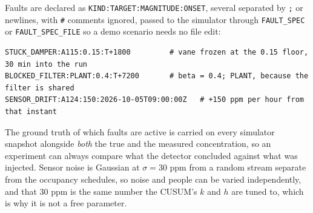 Faults are declared as \texttt{KIND:TARGET:MAGNITUDE:ONSET}, several separated by \texttt{;} or
newlines, with \texttt{\#} comments ignored, passed to the simulator through \texttt{FAULT\_SPEC}
or \texttt{FAULT\_SPEC\_FILE} so a demo scenario needs no file edit:

\begin{footnotesize}
\begin{verbatim}
STUCK_DAMPER:A115:0.15:T+1800         # vane frozen at the 0.15 floor, 30 min into the run
BLOCKED_FILTER:PLANT:0.4:T+7200       # beta = 0.4; PLANT, because the filter is shared
SENSOR_DRIFT:A124:150:2026-10-05T09:00:00Z   # +150 ppm per hour from that instant
\end{verbatim}
\end{footnotesize}

The ground truth of which faults are active is carried on every simulator snapshot alongside
\emph{both} the true and the measured concentration, so an experiment can always compare what the
detector concluded against what was injected. Sensor noise is Gaussian at
$\sigma = 30$ ppm from a random stream separate from the occupancy schedules, so noise and people
can be varied independently, and that 30 ppm is the same number the CUSUM's $k$ and $h$ are tuned
to, which is why it is not a free parameter.
